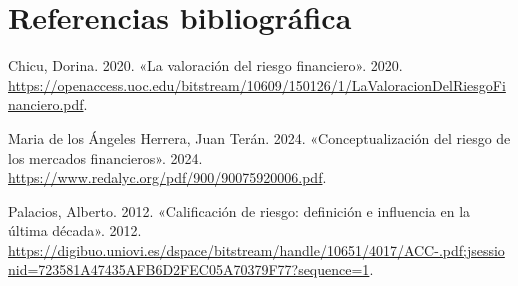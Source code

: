 \documentclass[
  letterpaper,
  DIV=11,
  numbers=noendperiod]{scrreprt}
\newlength{\cslhangindent}
\newenvironment{CSLReferences}[2] %
 {\begin{list}{}{%
  \setlength{\itemindent}{0pt}
  \setlength{\leftmargin}{0pt}
  \setlength{\parsep}{0pt}
  \ifodd #1
   \setlength{\leftmargin}{\cslhangindent}
   \setlength{\itemindent}{-1\cslhangindent}
  \fi
  \setlength{\itemsep}{#2\baselineskip}}}
 {\end{list}}
\begin{document}
\section{Referencias bibliográfica}\label{referencias-bibliogruxe1fica}

\label{refs}
\begin{CSLReferences}{1}{0}
Chicu, Dorina. 2020. {«La valoración del riesgo financiero»}. 2020.
\url{https://openaccess.uoc.edu/bitstream/10609/150126/1/LaValoracionDelRiesgoFinanciero.pdf}.

Maria de los Ángeles Herrera, Juan Terán. 2024. {«Conceptualización del
riesgo de los mercados financieros»}. 2024.
\url{https://www.redalyc.org/pdf/900/90075920006.pdf}.

Palacios, Alberto. 2012. {«Calificación de riesgo: definición e
influencia en la última década»}. 2012.
\url{https://digibuo.uniovi.es/dspace/bitstream/handle/10651/4017/ACC-.pdf;jsessionid=723581A47435AFB6D2FEC05A70379F77?sequence=1}.

\end{CSLReferences}
\end{document}
